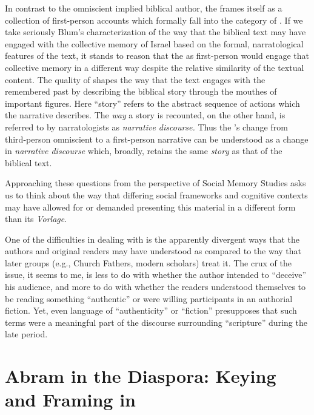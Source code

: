  In contrast to the omniscient implied biblical author, the \ga frames itself as a collection of first-person accounts which formally fall into the category of \psy. If we take seriously Blum's characterization of the way that the biblical text may have engaged with the collective memory of Israel based on the formal, narratological features of the text, it stands to reason that the \ga as first-person \psy would engage that collective memory in a different way despite the relative similarity of the textual content. The \psgraphic quality of \ga shapes the way that the text engages with the remembered past by describing the biblical story through the mouthes of important figures. Here ``story'' refers to the abstract sequence of actions which the narrative describes. The \emph{way} a story is recounted, on the other hand, is referred to by narratologists as \emph{narrative discourse.} Thus the \ga's change from third-person omniscient to a \psgraphical first-person narrative can be understood as a change in \emph{narrative discourse} which, broadly, retains the same \emph{story} as that of the biblical text.

 Approaching these questions from the perspective of Social Memory Studies asks us to think about the way that differing social frameworks and cognitive contexts may have allowed for or demanded presenting this material in a different form than its \emph{Vorlage}.

 One of the difficulties in dealing with \psy is the apparently divergent ways that the authors and original readers may have understood \psy as compared to the way that later groups (e.g., Church Fathers, modern scholars) treat it. The crux of the issue, it seems to me, is less to do with whether the author intended to ``deceive'' his audience, and more to do with whether the readers understood themselves to be reading something ``authentic'' or were willing participants in an authorial fiction. Yet, even language of ``authenticity'' or ``fiction'' presupposes that such terms were a meaningful part of the discourse surrounding ``scripture'' during the late \secondtemple period.

 \hypertarget{abram-in-the-diaspora-keying-and-framing-in-ga}{%
 \section{Abram in the Diaspora: Keying and Framing in \GA}\label{abram-in-the-diaspora-keying-and-framing-in-ga}}

